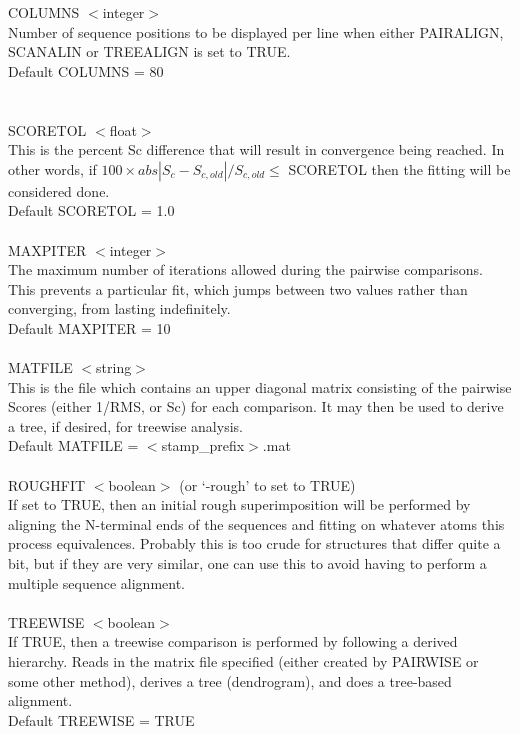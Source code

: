 COLUMNS $<$integer$>$\\
Number of sequence positions to be displayed per line when either
PAIRALIGN, SCANALIN or TREEALIGN is set to TRUE.\\
Default COLUMNS = 80\\
\\
\\
SCORETOL $<$float$>$ \\
This is the percent Sc difference that will result in convergence
being reached.  In other words, if $100 \times abs | S_{c} - S_{c,old} |/S_{c,old} \leq$ SCORETOL then
the fitting will be considered done.\\
Default SCORETOL = 1.0\\
\\

MAXPITER $<$integer$>$\\
The maximum number of iterations allowed during the pairwise
comparisons.  This prevents a particular fit, which jumps between
two values rather than converging, from lasting indefinitely.\\
Default MAXPITER = 10\\
\\
MATFILE $<$string$>$\\
This is the file which contains an upper diagonal matrix consisting
of the pairwise Scores (either 1/RMS, or Sc) for each comparison. 
It may then be used to derive a tree, if desired, for treewise 
analysis.\\
Default MATFILE = $<$stamp\_prefix$>$.mat\\
\\
ROUGHFIT $<$boolean$>$ (or `-rough' to set to TRUE)\\
If set to TRUE, then an initial rough superimposition will be
performed by aligning the N-terminal ends of the sequences and
fitting on whatever atoms this process equivalences.  Probably
this is too crude for structures that differ quite a bit, but if
they are very similar, one can use this to avoid having to
perform a multiple sequence alignment.\\
\\
TREEWISE $<$boolean$>$\\
If TRUE, then a treewise comparison is performed by following a
derived hierarchy.   Reads in the matrix file specified (either
created by PAIRWISE or some other method), derives a tree (dendrogram),
and does a tree-based alignment.\\
Default TREEWISE = TRUE\\
